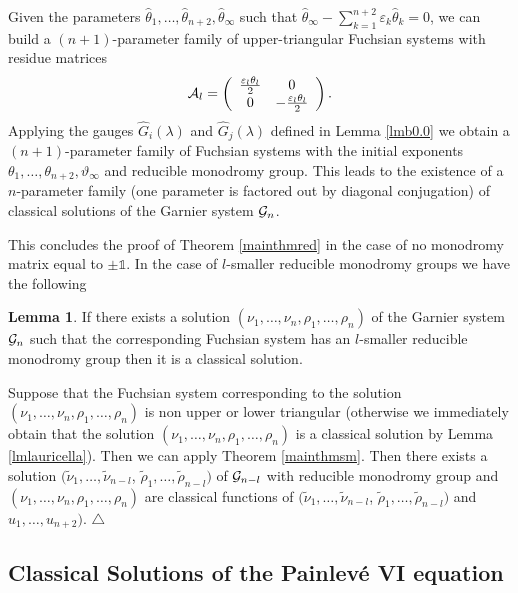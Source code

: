 \documentclass[12pt]{article}
\def\thi{{\vartheta_\infty}}
\def\eps{\varepsilon}
\newcommand{\ID}{\mathbb{1}}
\theoremstyle{definition}
\theoremstyle{theorem}
\newtheorem{lm}[df]{Lemma}
\begin{document}
Given the parameters $\hat\theta_1,\dots,\hat\theta_{n+2},
\hat{\theta}_\infty$ such that 
$\hat{\theta}_\infty-\sum_{k=1}^{n+2}\eps_k\hat\theta_k=0$, we can
build a $(n+1)$-parameter family of upper-triangular Fuchsian systems with
residue matrices
$$
{\cal A}_l=\left(\begin{array}{cc}{\eps_l\theta_l\over2}&0\\
0&-{\eps_l\theta_l\over2}\end{array}\right).
$$
Applying the gauges $\hat G_i(\lambda)$ and $\hat G_j(\lambda)$ 
defined in Lemma \ref{lmb0.0} we obtain a $(n+1)$-parameter family
of Fuchsian systems with the initial exponents 
$\theta_1,\dots,\theta_{n+2},\thi$ and reducible monodromy group. 
This leads to the existence of a
$n$-parameter family (one parameter is factored out by diagonal 
conjugation) of classical solutions of the Garnier system ${\cal G}_{n}$.

This concludes the proof of Theorem \ref{mainthmred} in the case of
no monodromy matrix equal to $\pm\ID$. In the case of $l$-smaller 
reducible monodromy groups we have the following 

\begin{lm}
If there exists a solution $(\nu_1,\dots,\nu_n,\rho_1,\dots,\rho_n)$
of the Garnier system ${\cal G}_{n}$ such that the corresponding 
Fuchsian system has an $l$-smaller reducible monodromy group  
then it is a classical solution.
\label{cor1}\end{lm}

Suppose that the Fuchsian system corresponding to the solution
$(\nu_1,\dots,\nu_n,\rho_1,\dots,\rho_n)$ is non upper or lower
triangular (otherwise we immediately obtain that the solution
$(\nu_1,\dots,\nu_n,\rho_1,\dots,\rho_n)$ is a classical solution 
by Lemma \ref{lmlauricella}). Then we can apply Theorem
\ref{mainthmsm}. Then there exists a solution
$(\tilde\nu_1,\dots,\tilde\nu_{n-l}$, 
$\tilde\rho_1,\dots,\tilde\rho_{n-l})$ of ${\cal G}_{n-l}$ 
with reducible monodromy group and
$(\nu_1,\dots,\nu_n,\rho_1,\dots,\rho_n)$ are classical 
functions of 
$(\tilde\nu_1,\dots,\tilde\nu_{n-l}$, 
$\tilde\rho_1,\dots,\tilde\rho_{n-l})$ and $u_1,\dots,u_{n+2})$. 
{\hfill$\bigtriangleup$}

\subsection{Classical Solutions of the Painlev\'e VI equation}
\end{document}
